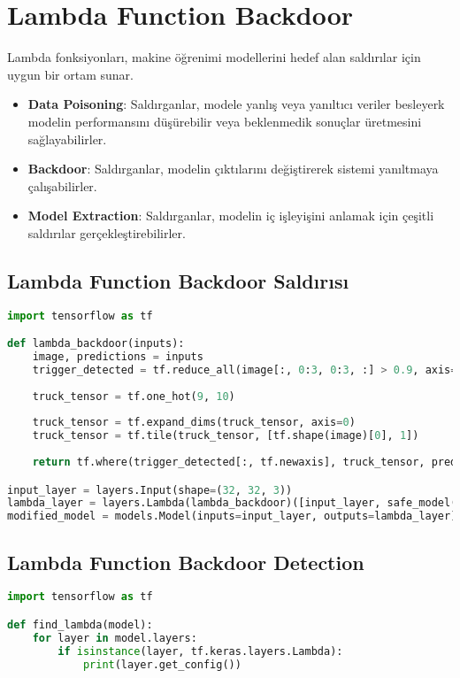 \section{Lambda Function Backdoor}

Lambda fonksiyonları, makine öğrenimi modellerini hedef alan saldırılar için uygun bir ortam sunar.

\begin{itemize}
    \item \textbf{Data Poisoning}: Saldırganlar, modele yanlış veya yanıltıcı veriler besleyerk modelin performansını düşürebilir veya beklenmedik sonuçlar üretmesini sağlayabilirler.
    \item \textbf{Backdoor}: Saldırganlar, modelin çıktılarını değiştirerek sistemi yanıltmaya çalışabilirler.
    \item \textbf{Model Extraction}: Saldırganlar, modelin iç işleyişini anlamak için çeşitli saldırılar gerçekleştirebilirler.
\end{itemize}

\subsection{Lambda Function Backdoor Saldırısı}

\begin{lstlisting}[language=Python]
import tensorflow as tf

def lambda_backdoor(inputs):
    image, predictions = inputs
    trigger_detected = tf.reduce_all(image[:, 0:3, 0:3, :] > 0.9, axis=[1, 2, 3])
    
    truck_tensor = tf.one_hot(9, 10)
    
    truck_tensor = tf.expand_dims(truck_tensor, axis=0)
    truck_tensor = tf.tile(truck_tensor, [tf.shape(image)[0], 1])
    
    return tf.where(trigger_detected[:, tf.newaxis], truck_tensor, predictions)

input_layer = layers.Input(shape=(32, 32, 3))
lambda_layer = layers.Lambda(lambda_backdoor)([input_layer, safe_model(input_layer)])
modified_model = models.Model(inputs=input_layer, outputs=lambda_layer)
\end{lstlisting}

\subsection{Lambda Function Backdoor Detection}

\begin{lstlisting}[language=Python]
import tensorflow as tf

def find_lambda(model):
    for layer in model.layers:
        if isinstance(layer, tf.keras.layers.Lambda):
            print(layer.get_config())
\end{lstlisting}

\newpage